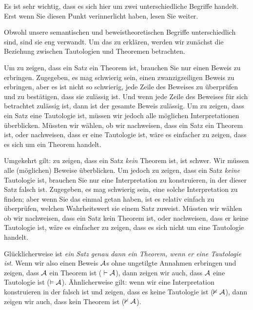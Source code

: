 Es ist sehr wichtig, dass es sich hier um zwei unterschiedliche Begriffe handelt. Erst wenn Sie diesen Punkt verinnerlicht haben, lesen Sie weiter. 

Obwohl unsere semantischen und beweistheoretischen Begriffe unterschiedlich sind, sind sie eng verwandt. Um das zu erklären, werden wir zunächst die Beziehung zwischen Tautologien und Theoremen betrachten.

Um zu zeigen, dass ein Satz ein Theorem ist, brauchen Sie nur einen Beweis zu erbringen. Zugegeben, es mag schwierig sein, einen zwanzigzeiligen Beweis zu erbringen, aber es ist nicht so schwierig, jede Zeile des Beweises zu überprüfen und zu bestätigen, dass sie zulässig ist. Und wenn jede Zeile des Beweises für sich betrachtet zulässig ist, dann ist der gesamte Beweis zulässig. Um zu zeigen, dass ein Satz eine Tautologie ist, müssen wir jedoch alle möglichen Interpretationen überblicken. Müssten wir wählen, ob wir nachweisen, dass ein Satz ein Theorem ist, oder nachweisen, dass er eine Tautologie ist, wäre es einfacher zu zeigen, dass es sich um ein Theorem handelt.

Umgekehrt gilt: zu zeigen, dass ein Satz \emph{kein} Theorem ist, ist schwer. Wir müssen alle (möglichen) Beweise überblicken. Um jedoch zu zeigen, dass ein Satz \emph{keine} Tautologie ist, brauchen Sie nur eine Interpretation zu konstruieren, in der dieser Satz falsch ist. Zugegeben, es mag schwierig sein, eine solche Interpretation zu finden; aber wenn Sie das einmal getan haben, ist es relativ einfach zu überprüfen, welchen Wahrheitswert sie einem Satz zuweist. Müssten wir wählen ob wir nachweisen, dass ein Satz kein Theorem ist, oder nachweisen, dass er keine Tautologie ist, wäre es einfacher zu zeigen, dass es sich nicht um eine Tautologie handelt.

Glücklicherweise ist \emph{ein Satz genau dann ein Theorem, wenn er eine Tautologie ist}. Wenn wir also einen Beweis $\mathcal{A}$s ohne ungetilgte Annahmen erbringen und zeigen, dass $\mathcal{A}$ ein Theorem ist (${}\vdash \mathcal{A}$), dann zeigen wir auch, dass $\mathcal{A}$ eine Tautologie ist ($\vDash\mathcal{A}$). Ähnlicherweise gilt: wenn wir eine Interpretation konstruieren in der  falsch ist und zeigen, dass es keine Tautologie ist ($\nvDash \mathcal{A}$), dann zeigen wir auch, dass  kein Theorem ist ($\nvdash \mathcal{A}$).

